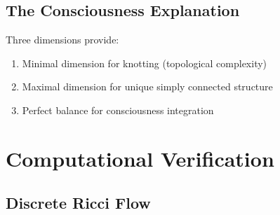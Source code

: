 \documentclass[12pt]{article}
\begin{document}
\subsection{The Consciousness Explanation}

Three dimensions provide:
\begin{enumerate}
\item Minimal dimension for knotting (topological complexity)
\item Maximal dimension for unique simply connected structure
\item Perfect balance for consciousness integration
\end{enumerate}

\section{Computational Verification}

\subsection{Discrete Ricci Flow}
\end{document}
